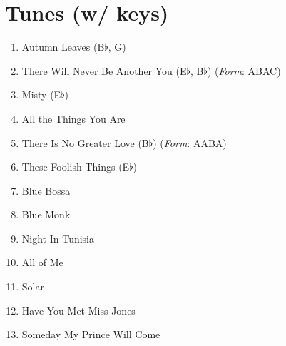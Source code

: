 \documentclass[10pt,a4paper]{article}
\begin{document}
\section{Tunes (w/ keys)}

\begin{enumerate}
    \item Autumn Leaves (B$\flat$, G)
    \item There Will Never Be Another You (E$\flat$, B$\flat$) (\textit{Form}: ABAC)
    \item Misty (E$\flat$)
    \item All the Things You Are
    \item There Is No Greater Love (B$\flat$) (\textit{Form}: AABA)
    \item These Foolish Things (E$\flat$)
    \item Blue Bossa
    \item Blue Monk
    \item Night In Tunisia
    \item All of Me
    \item Solar
    \item Have You Met Miss Jones
    \item Someday My Prince Will Come

\end{enumerate}
\end{document}
